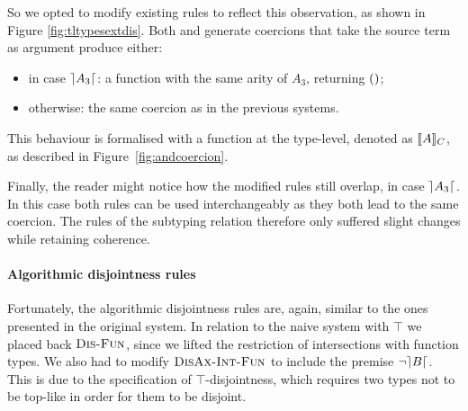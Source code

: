 So we opted to modify existing rules to reflect this observation, as shown in Figure \ref{fig:tltypesextdis}.
Both  and  generate coercions that take the source term 
as argument produce either:
\begin{itemize}
\item in case $\rceil A_3 \lceil$: a function with the same arity of $A_3$, returning $()$;  
\item otherwise: the same coercion as in the previous systems.
\end{itemize}
This behaviour is formalised with a function at the type-level, denoted as $\llbracket A \rrbracket_{C}$, as described in
Figure~\ref{fig:andcoercion}.

Finally, the reader might notice how the modified rules still overlap, in case $\rceil A_3 \lceil$. 
In this case both rules can be used interchangeably as they both lead to the same coercion.
The rules of the subtyping relation therefore only suffered slight changes while retaining coherence.

\paragraph{Algorithmic disjointness rules}

Fortunately, the algorithmic disjointness rules are, again, similar to the ones presented in the original system.
In relation to the naive system with $\top$ we placed back $\textsc{Dis-Fun}$, since we lifted the restriction
of intersections with function types.
We also had to modify $\textsc{DisAx-Int-Fun}$ to include the premise $\neg \rceil B \lceil$.
This is due to the specification of $\top$-disjointness, which requires two types not to be top-like in order for them to be disjoint.

